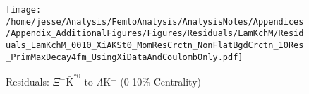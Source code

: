 \documentclass[/home/jesse/Analysis/FemtoAnalysis/AnalysisNotes/AnalysisNoteJBuxton.tex]{subfiles}
\begin{document}
\begin{figure}[h]
  \centering
  \texttt{[image: /home/jesse/Analysis/FemtoAnalysis/AnalysisNotes/Appendices/Appendix\_AdditionalFigures/Figures/Residuals/LamKchM/Residuals\_LamKchM\_0010\_XiAKSt0\_MomResCrctn\_NonFlatBgdCrctn\_10Res\_PrimMaxDecay4fm\_UsingXiDataAndCoulombOnly.pdf]}
  \caption[Residuals: $\Xi^{-}\bar{\mathrm{K}}^{*0}$ to $\Lambda$K$^{-}$ (0-10\% Centrality)]{Residuals: $\Xi^{-}\bar{\mathrm{K}}^{*0}$ to $\Lambda$K$^{-}$ (0-10\% Centrality)}
  \label{fig:Res_LamKchM_0010_XiCAKSt0}
\end{figure}
\end{document}
